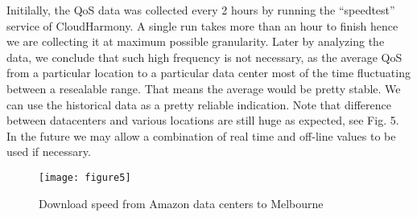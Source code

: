 \documentclass[journal]{IEEEtran}
\begin{document}
Initilally, the QoS data was collected every 2 hours by running the ``speedtest'' service of CloudHarmony. A single run takes more than an hour to finish hence we are collecting it at maximum possible granularity. Later by analyzing the data, we conclude that such high frequency is not necessary, as the average QoS from a particular location to a particular data center most of the time fluctuating between a resealable range. That means the average would be pretty stable. We can use the historical data as a pretty reliable indication. Note that difference between datacenters and various locations are still huge as expected, see Fig. 5. In the future we may allow a combination of real time and off-line values to be used if necessary.

\begin{figure}[!h]
 \centering
 \texttt{[image: figure5]}
 \caption{Download speed from Amazon data centers to Melbourne}
\label{fig5}
\end{figure}
\end{document}
